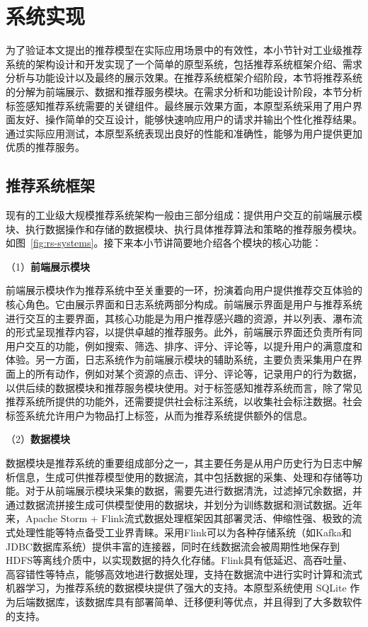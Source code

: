 \section{系统实现}
为了验证本文提出的推荐模型在实际应用场景中的有效性，本小节针对工业级推荐系统的架构设计和开发实现了一个简单的原型系统，包括推荐系统框架介绍、需求分析与功能设计以及最终的展示效果。在推荐系统框架介绍阶段，本节将推荐系统的分解为前端展示、数据和推荐服务模块。在需求分析和功能设计阶段，本节分析标签感知推荐系统需要的关键组件。最终展示效果方面，本原型系统采用了用户界面友好、操作简单的交互设计，能够快速响应用户的请求并输出个性化推荐结果。通过实际应用测试，本原型系统表现出良好的性能和准确性，能够为用户提供更加优质的推荐服务。

\subsection{推荐系统框架}
现有的工业级大规模推荐系统架构一般由三部分组成：提供用户交互的前端展示模块、执行数据操作和存储的数据模块、执行具体推荐算法和策略的推荐服务模块。如图~\ref{fig:rs-systems}。接下来本小节讲简要地介绍各个模块的核心功能：

（1）\textbf{前端展示模块}

前端展示模块作为推荐系统中至关重要的一环，扮演着向用户提供推荐交互体验的核心角色。它由展示界面和日志系统两部分构成。前端展示界面是用户与推荐系统进行交互的主要界面，其核心功能是为用户推荐感兴趣的资源，并以列表、瀑布流的形式呈现推荐内容，以提供卓越的推荐服务。此外，前端展示界面还负责所有同用户交互的功能，例如搜索、筛选、排序、评分、评论等，以提升用户的满意度和体验。另一方面，日志系统作为前端展示模块的辅助系统，主要负责采集用户在界面上的所有动作，例如对某个资源的点击、评分、评论等，记录用户的行为数据，以供后续的数据模块和推荐服务模块使用。对于标签感知推荐系统而言，除了常见推荐系统所提供的功能外，还需要提供社会标注系统，以收集社会标注数据。社会标签系统允许用户为物品打上标签，从而为推荐系统提供额外的信息。

（2）\textbf{数据模块}

数据模块是推荐系统的重要组成部分之一，其主要任务是从用户历史行为日志中解析信息，生成可供推荐模型使用的数据流，其中包括数据的采集、处理和存储等功能。对于从前端展示模块采集的数据，需要先进行数据清洗，过滤掉冗余数据，并通过数据流拼接生成可供模型使用的数据块，并划分为训练数据和测试数据。近年来，Apache Storm + Flink流式数据处理框架因其部署灵活、伸缩性强、极致的流式处理性能等特点备受工业界青睐。采用Flink可以为各种存储系统（如Kafka和JDBC数据库系统）提供丰富的连接器，同时在线数据流会被周期性地保存到HDFS等离线介质中，以实现数据的持久化存储。Flink具有低延迟、高吞吐量、高容错性等特点，能够高效地进行数据处理，支持在数据流中进行实时计算和流式机器学习，为推荐系统的数据模块提供了强大的支持。本原型系统使用 SQLite 作为后端数据库，该数据库具有部署简单、迁移便利等优点，并且得到了大多数软件的支持。

